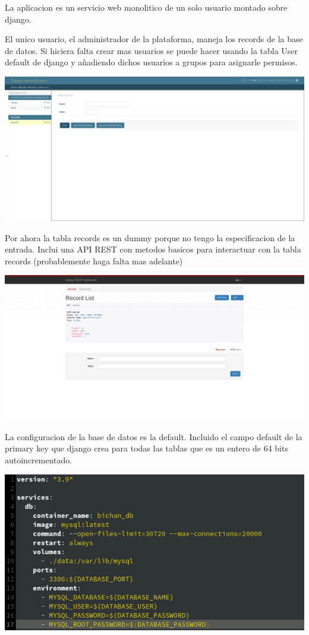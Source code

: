 \documentclass{report}
\begin{document}
La aplicacion es un servicio web monolitico de un solo usuario montado sobre django.

El unico usuario, el administrador de la plataforma, maneja los records de la base de datos.
Si hiciera falta crear mas usuarios se puede hacer usando la tabla User default de django y añadiendo dichos usuarios a grupos para asignarle permisos.

\includegraphics[scale=0.2]{record}

Por ahora la tabla records es un dummy porque no tengo la especificacion de la entrada.
Inclui una API REST con metodos basicos para interactuar con la tabla records (probablemente haga falta mas adelante)

\includegraphics[scale=0.2]{api}

La configuracion de la base de datos es la default. Incluido el campo default de la primary key que django crea para todas las tablas que es un entero de 64 bits autoincrementado.

\includegraphics[scale=0.5]{docker}
\end{document}
